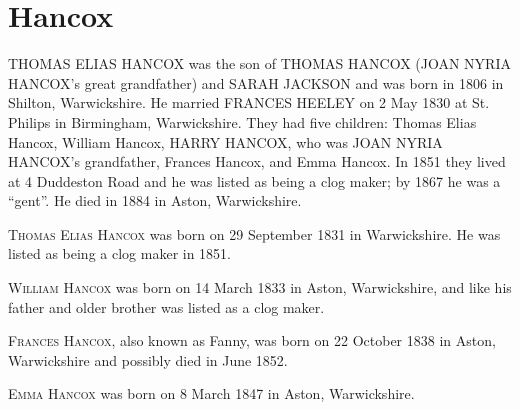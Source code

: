 \section{Hancox}


\uppercase{Thomas Elias Hancox} was the son of \uppercase{Thomas Hancox} (\uppercase{Joan Nyria Hancox}'s great grandfather) and \uppercase{Sarah Jackson} and was born in 1806 in Shilton, Warwickshire.  He married \uppercase{Frances Heeley} on	2 May 1830 at St. Philips in	Birmingham, Warwickshire. They had five children: Thomas Elias Hancox, William Hancox, \uppercase{Harry Hancox}, who was \uppercase{Joan Nyria Hancox}'s grandfather, Frances Hancox, and Emma Hancox.  In 1851 they lived at 4 Duddeston Road and he was listed as being a clog maker; by 1867 he was a ``gent''. He died in 1884 in Aston, Warwickshire.

\textsc{Thomas Elias Hancox} was born on 29 September 1831 in	Warwickshire. He was listed as being a clog maker in 1851.

\textsc{William Hancox} was born on 14 March 1833 in Aston, Warwickshire, and like his father and older brother was listed as a clog maker.

\textsc{Frances Hancox}, also known as Fanny, was born on 22 October 1838 in Aston, Warwickshire and possibly died in June 1852.

\textsc{Emma Hancox} was born on	8 March 1847 in	Aston, Warwickshire.

